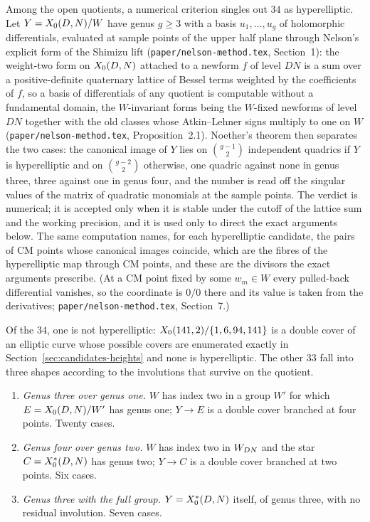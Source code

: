 Among the open quotients, a numerical criterion singles out $34$ as hyperelliptic. Let $Y=X_0({D},{N})/W$ have
genus $g\ge3$ with a basis $u_1,\dots,u_g$ of holomorphic differentials, evaluated at sample points of the upper
half plane through Nelson's explicit form of the Shimizu lift (\texttt{paper/nelson-method.tex}, Section~1): the
weight-two form on $X_0({D},{N})$ attached to a newform $f$ of level $DN$ is a sum over a positive-definite
quaternary lattice of Bessel terms weighted by the coefficients of $f$, so a basis of differentials of any
quotient is computable without a fundamental domain, the $W$-invariant forms being the $W$-fixed newforms of
level $DN$ together with the old classes whose Atkin--Lehner signs multiply to one on $W$
(\texttt{paper/nelson-method.tex}, Proposition~2.1). Noether's theorem then separates the two cases: the
canonical image of $Y$ lies on $\binom{g-1}{2}$ independent quadrics if $Y$ is hyperelliptic and on
$\binom{g-2}{2}$ otherwise, one quadric against none in genus three, three against one in genus four, and the
number is read off the singular values of the matrix of quadratic monomials at the sample points. The verdict is
numerical; it is accepted only when it is stable under the cutoff of the lattice sum and the working precision,
and it is used only to direct the exact arguments below. The same computation names, for each hyperelliptic
candidate, the pairs of CM points whose canonical images coincide, which are the fibres of the hyperelliptic map
through CM points, and these are the divisors the exact arguments prescribe. (At a CM point fixed by some
$w_m\in W$ every pulled-back differential vanishes, so the coordinate is $0/0$ there and its value is taken from
the derivatives; \texttt{paper/nelson-method.tex}, Section~7.)

Of the $34$, one is not hyperelliptic: $X_0({141},{2})/\{1,6,94,141\}$ is a double cover of an elliptic curve
whose possible covers are enumerated exactly in Section~\ref{sec:candidates-heights} and none is hyperelliptic.
The other $33$ fall into three shapes according to the involutions that survive on the quotient.

\begin{enumerate}
\item \emph{Genus three over genus one.} $W$ has index two in a group $W'$ for which $E=X_0({D},{N})/W'$ has
genus one; $Y\to E$ is a double cover branched at four points. Twenty cases.
\item \emph{Genus four over genus two.} $W$ has index two in $W_{{D}{N}}$ and the star
$C=X_0^*({D},{N})$ has genus two; $Y\to C$ is a double cover branched at two points. Six cases.
\item \emph{Genus three with the full group.} $Y=X_0^*({D},{N})$ itself, of genus three, with no residual
involution. Seven cases.
\end{enumerate}

